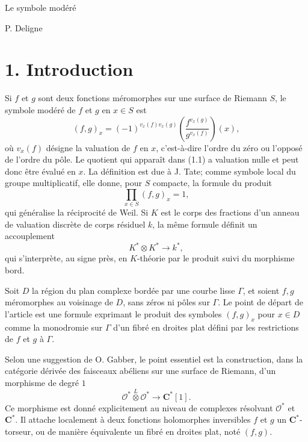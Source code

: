 \documentclass[11pt]{article}
\newcommand{\C}{\mathbf C}
\newcommand{\OO}{\mathcal O}
\begin{document}
\begin{center}
 {\Large Le symbole modéré}\par
 \vspace{0.5em}
 {P. Deligne}\par
\end{center}


\section*{1. Introduction}

Si $f$ et $g$ sont deux fonctions méromorphes sur une surface de Riemann $S$, le symbole modéré de $f$ et $g$ en $x\in S$ est
\begin{equation}\tag{1.1}
 (f,g)_x=(-1)^{v_x(f)v_x(g)}\left(\frac{f^{v_x(g)}}{g^{v_x(f)}}\right)(x),
\end{equation}
où $v_x(f)$ désigne la valuation de $f$ en $x$, c'est-à-dire l'ordre du zéro ou l'opposé de l'ordre du pôle. Le quotient qui apparaît dans (1.1) a valuation nulle et peut donc être évalué en $x$. La définition est due à J. Tate; comme symbole local du groupe multiplicatif, elle donne, pour $S$ compacte, la formule du produit
\begin{equation}\tag{1.2}
 \prod_{x\in S}(f,g)_x=1,
\end{equation}
qui généralise la réciprocité de Weil. Si $K$ est le corps des fractions d'un anneau de valuation discrète de corps résiduel $k$, la même formule définit un accouplement
\[
 K^*\otimes K^*\longrightarrow k^*,
\]
qui s'interprète, au signe près, en $K$-théorie par le produit suivi du morphisme bord.

Soit $D$ la région du plan complexe bordée par une courbe lisse $\Gamma$, et soient $f,g$ méromorphes au voisinage de $D$, sans zéros ni pôles sur $\Gamma$. Le point de départ de l'article est une formule exprimant le produit des symboles $(f,g)_x$ pour $x\in D$ comme la monodromie sur $\Gamma$ d'un fibré en droites plat défini par les restrictions de $f$ et $g$ à $\Gamma$.

Selon une suggestion de O. Gabber, le point essentiel est la construction, dans la catégorie dérivée des faisceaux abéliens sur une surface de Riemann, d'un morphisme de degré $1$
\begin{equation}\tag{1.3}
 \OO^*\overset L\otimes\OO^*\longrightarrow \C^*[1].
\end{equation}
Ce morphisme est donné explicitement au niveau de complexes résolvant $\OO^*$ et $\C^*$. Il attache localement à deux fonctions holomorphes inversibles $f$ et $g$ un $\C^*$-torseur, ou de manière équivalente un fibré en droites plat, noté $(f,g)$.
\end{document}
